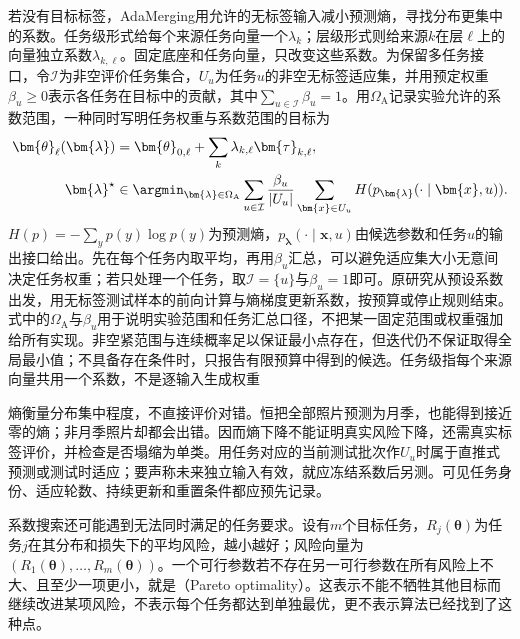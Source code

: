 若没有目标标签，AdaMerging用允许的无标签输入减小预测熵，寻找分布更集中的系数。任务级形式给每个来源任务向量一个$\lambda_k$；层级形式则给来源$k$在层$\ell$上的向量独立系数$\lambda_{k,\ell}$。固定底座和任务向量，只改变这些系数。为保留多任务接口，令$\mathcal I$为非空评价任务集合，$U_u$为任务$u$的非空无标签适应集，并用预定权重$\beta_u\geq0$表示各任务在目标中的贡献，其中$\sum_{u\in\mathcal I}\beta_u=1$。用$\Omega_{\mathrm{A}}$记录实验允许的系数范围，一种同时写明任务权重与系数范围的目标为
\begin{equation}
  \begin{aligned}
    \bm{\theta}_{\ell}(\bm{\lambda})
      &=\bm{\theta}_{0,\ell}+\sum_k\lambda_{k,\ell}\bm{\tau}_{k,\ell},\\
    \bm{\lambda}^{\star}
      &\in\argmin_{\bm{\lambda}\in\Omega_{\mathrm{A}}}
        \sum_{u\in\mathcal I}\frac{\beta_u}{|U_u|}
        \sum_{\bm{x}\in U_u}
        H(p_{\bm{\lambda}}(\cdot\mid\bm{x},u)).
  \end{aligned}
  \label{eq:ket-integration-adamerging}
\end{equation}
$H(p)=-\sum_y p(y)\log p(y)$为预测熵，$p_{\bm{\lambda}}(\cdot\mid\bm{x},u)$由候选参数和任务$u$的输出接口给出。先在每个任务内取平均，再用$\beta_u$汇总，可以避免适应集大小无意间决定任务权重；若只处理一个任务，取$\mathcal I=\{u\}$与$\beta_u=1$即可。原研究从预设系数出发，用无标签测试样本的前向计算与熵梯度更新系数，按预算或停止规则结束。式中的$\Omega_{\mathrm{A}}$与$\beta_u$用于说明实验范围和任务汇总口径，不把某一固定范围或权重强加给所有实现。非空紧范围与连续概率足以保证最小点存在，但迭代仍不保证取得全局最小值；不具备存在条件时，只报告有限预算中得到的候选。任务级指每个来源向量共用一个系数，不是逐输入生成权重

熵衡量分布集中程度，不直接评价对错。恒把全部照片预测为月季，也能得到接近零的熵；非月季照片却都会出错。因而熵下降不能证明真实风险下降，还需真实标签评价，并检查是否塌缩为单类。用任务对应的当前测试批次作$U_u$时属于直推式预测或测试时适应；要声称未来独立输入有效，就应冻结系数后另测。可见任务身份、适应轮数、持续更新和重置条件都应预先记录。

系数搜索还可能遇到无法同时满足的任务要求。设有$m$个目标任务，$R_j(\bm{\theta})$为任务$j$在其分布和损失下的平均风险，越小越好；风险向量为$(R_1(\bm{\theta}),\ldots,R_m(\bm{\theta}))$。一个可行参数若不存在另一可行参数在所有风险上不大、且至少一项更小，就是（Pareto optimality）。这表示不能不牺牲其他目标而继续改进某项风险，不表示每个任务都达到单独最优，更不表示算法已经找到了这种点。

